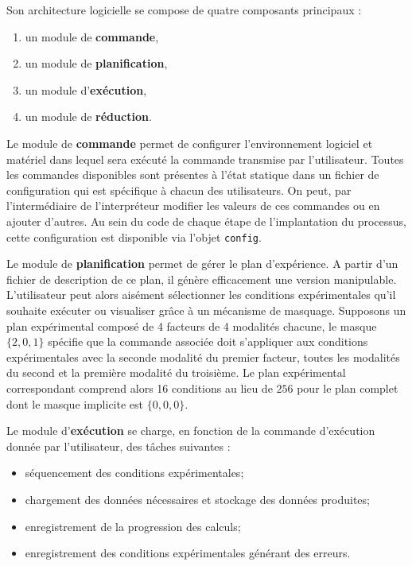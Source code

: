 Son architecture logicielle se compose de quatre composants principaux :
\begin{enumerate}
  \item un module de \textbf{commande},
  \item un module de \textbf{planification},
  \item un module d'\textbf{exécution},
  \item un module de \textbf{réduction}.
\end{enumerate}

Le module de \textbf{commande} permet de configurer l'environnement logiciel et matériel dans lequel sera exécuté la commande transmise par l'utilisateur. Toutes les commandes disponibles sont présentes à l'état statique dans un fichier de configuration qui est spécifique à chacun des utilisateurs. On peut, par l'intermédiaire de l'interpréteur modifier les valeurs de ces commandes ou en ajouter d'autres. Au sein du code de chaque étape de l'implantation du processus, cette configuration est disponible via l'objet \texttt{config}.

Le module de \textbf{planification} permet de gérer le plan d'expérience. A partir d'un fichier de description de ce plan, il génère efficacement une version manipulable. L'utilisateur peut alors aisément sélectionner les conditions expérimentales qu'il souhaite exécuter ou visualiser grâce à un mécanisme de masquage. Supposons un plan expérimental composé de 4 facteurs de 4 modalités chacune, le masque $\{2, 0, 1\}$ spécifie que la commande associée doit s'appliquer aux conditions expérimentales avec la seconde modalité du premier facteur, toutes les modalités du second et la première modalité du troisième. Le plan expérimental correspondant comprend alors 16 conditions au lieu de  $256$ pour le plan complet dont le masque implicite est $\{0, 0, 0\}$.

Le module d'\textbf{exécution} se charge, en fonction de la commande d'exécution donnée par l'utilisateur, des tâches suivantes :
\begin{itemize}
  \item séquencement des conditions expérimentales;
  \item chargement des données nécessaires et stockage des données produites;
  \item enregistrement de la progression des calculs;
  \item enregistrement des conditions expérimentales générant des erreurs.
\end{itemize}

